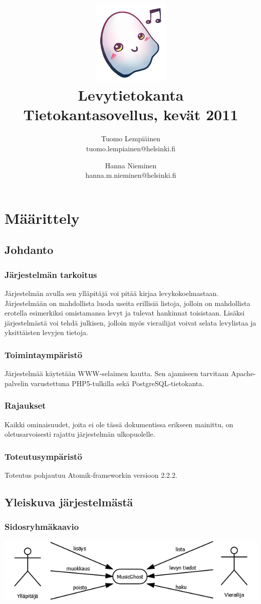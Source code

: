 \documentclass[a4paper,12pt]{report}
\title{\includegraphics[width=5em]{logo}\\\vspace{1em}Levytietokanta\\
  \large{Tietokantasovellus, kevät 2011}\\}
\author{Tuomo Lempiäinen\\tuomo.lempiainen@helsinki.fi \and
Hanna Nieminen\\hanna.m.nieminen@helsinki.fi}
\begin{document}
\maketitle

\tableofcontents

\chapter{Määrittely}

\section{Johdanto}

\subsection{Järjestelmän tarkoitus}
Järjestelmän avulla sen ylläpitäjä voi pitää kirjaa levykokoelmastaan.
Järjestelmään on mahdollista luoda useita erillisiä listoja, jolloin on
mahdollista erotella esimerkiksi omistamansa levyt ja tulevat hankinnat
toisistaan.  Lisäksi järjestelmästä voi tehdä julkisen, jolloin myös vierailijat
voivat selata levylistaa ja yksittäisten levyjen tietoja.

\subsection{Toimintaympäristö}
Järjestelmää käytetään WWW-selaimen kautta. Sen ajamiseen tarvitaan
Apache-palvelin varustettuna PHP5-tulkilla sekä PostgreSQL-tietokanta.

\subsection{Rajaukset}
Kaikki ominaisuudet, joita ei ole tässä dokumentissa erikseen mainittu, on
oletusarvoisesti rajattu järjestelmän ulkopuolelle.

\subsection{Toteutusympäristö}
Toteutus pohjautuu Atomik-frameworkin versioon 2.2.2.

\section{Yleiskuva järjestelmästä}

\subsection{Sidosryhmäkaavio}
\vspace{1em}
\includegraphics[width=\linewidth]{sidosryhmakaavio}
\end{document}
